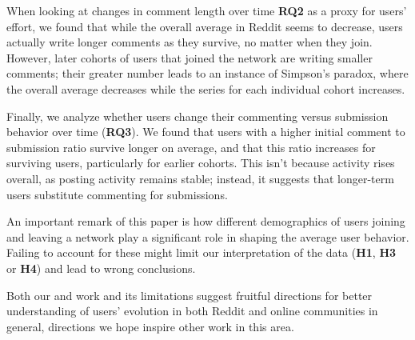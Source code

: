 When looking at changes in comment length over time \textbf{RQ2} as a proxy for users' effort, we found that while the overall average in Reddit seems to decrease, users actually write longer comments as they survive, no matter when they join.  However, later cohorts of users that joined the network are writing smaller comments; their greater number leads to an instance of Simpson's paradox, where the overall average decreases while the series for each individual cohort increases. 

Finally, we analyze whether users change their commenting versus submission behavior over time (\textbf{RQ3}). 
We found that users with a higher initial comment to submission ratio survive longer on average, and that this ratio increases for surviving users, particularly for earlier cohorts.  This isn't because activity rises overall, as posting activity remains stable; instead, it suggests that longer-term users substitute commenting for submissions. 

An important remark of this paper is how different demographics of users joining and leaving a network play a significant role in shaping the average user behavior. Failing to account for these might limit our interpretation of the data (\textbf{H1}, \textbf{H3} or \textbf{H4}) and lead to wrong conclusions.

Both our and work and its limitations suggest fruitful directions for better understanding of users' evolution in both Reddit and online communities in general, directions we hope inspire other work in this area.  
